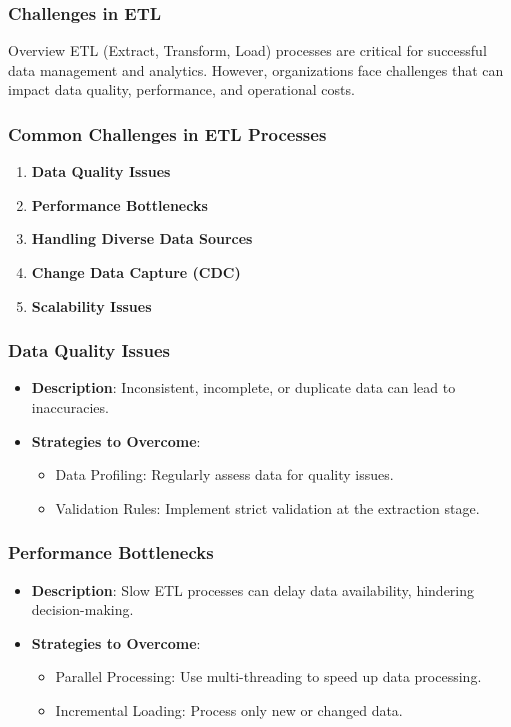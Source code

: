 \documentclass[aspectratio=169]{beamer}
\begin{document}
\begin{frame}
    \frametitle{Challenges in ETL}
    \begin{block}{Overview}
        ETL (Extract, Transform, Load) processes are critical for successful data management and analytics. However, organizations face challenges that can impact data quality, performance, and operational costs.
    \end{block}
\end{frame}

\begin{frame}
    \frametitle{Common Challenges in ETL Processes}
    \begin{enumerate}
        \item \textbf{Data Quality Issues}
        \item \textbf{Performance Bottlenecks}
        \item \textbf{Handling Diverse Data Sources}
        \item \textbf{Change Data Capture (CDC)}
        \item \textbf{Scalability Issues}
    \end{enumerate}
\end{frame}

\begin{frame}
    \frametitle{Data Quality Issues}
    \begin{itemize}
        \item \textbf{Description}: Inconsistent, incomplete, or duplicate data can lead to inaccuracies.
        \item \textbf{Strategies to Overcome}:
        \begin{itemize}
            \item Data Profiling: Regularly assess data for quality issues.
            \item Validation Rules: Implement strict validation at the extraction stage.
        \end{itemize}
    \end{itemize}
\end{frame}

\begin{frame}
    \frametitle{Performance Bottlenecks}
    \begin{itemize}
        \item \textbf{Description}: Slow ETL processes can delay data availability, hindering decision-making.
        \item \textbf{Strategies to Overcome}:
        \begin{itemize}
            \item Parallel Processing: Use multi-threading to speed up data processing.
            \item Incremental Loading: Process only new or changed data.
        \end{itemize}
    \end{itemize}
\end{frame}
\end{document}
